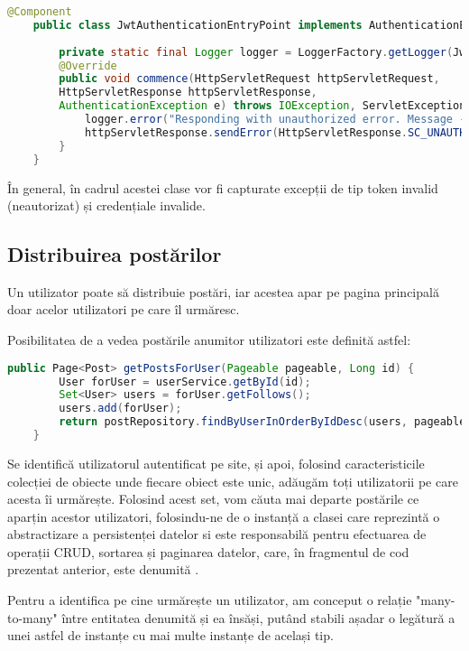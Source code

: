 \begin{lstlisting}[language=Java]
	@Component
	public class JwtAuthenticationEntryPoint implements AuthenticationEntryPoint {
		
		private static final Logger logger = LoggerFactory.getLogger(JwtAuthenticationEntryPoint.class);
		@Override
		public void commence(HttpServletRequest httpServletRequest,
		HttpServletResponse httpServletResponse,
		AuthenticationException e) throws IOException, ServletException {
			logger.error("Responding with unauthorized error. Message - {}", e.getMessage());
			httpServletResponse.sendError(HttpServletResponse.SC_UNAUTHORIZED, e.getMessage());
		}
	}
\end{lstlisting}
\bigskip
În general, în cadrul acestei clase vor fi capturate excepții de tip token invalid (neautorizat) și credențiale invalide.\newline

\subsection{Distribuirea postărilor}
Un utilizator poate să distribuie postări, iar acestea apar pe pagina principală doar acelor utilizatori pe care îl urmăresc.\newline

Posibilitatea de a vedea postările anumitor utilizatori este definită astfel:\newline

\begin{lstlisting}[language=Java]
	public Page<Post> getPostsForUser(Pageable pageable, Long id) {
		User forUser = userService.getById(id);
		Set<User> users = forUser.getFollows();
		users.add(forUser);
		return postRepository.findByUserInOrderByIdDesc(users, pageable);
	}
\end{lstlisting}
\bigskip
Se identifică utilizatorul autentificat pe site, și apoi, folosind caracteristicile colecției de obiecte  unde fiecare obiect este unic, adăugăm toți utilizatorii pe care acesta îi urmărește. Folosind acest set, vom căuta mai departe postările ce aparțin acestor utilizatori, folosindu-ne de o instanță a clasei care reprezintă o abstractizare a persistenței datelor si este responsabilă pentru efectuarea de operații CRUD, sortarea și paginarea datelor, care, în fragmentul de cod prezentat anterior, este denumită .\newline

Pentru a identifica pe cine urmărește un utilizator, am conceput o relație "many-to-many" între entitatea denumită  și ea însăși, putând stabili așadar o legătură a unei astfel de instanțe cu mai multe instanțe de același tip.\newline

